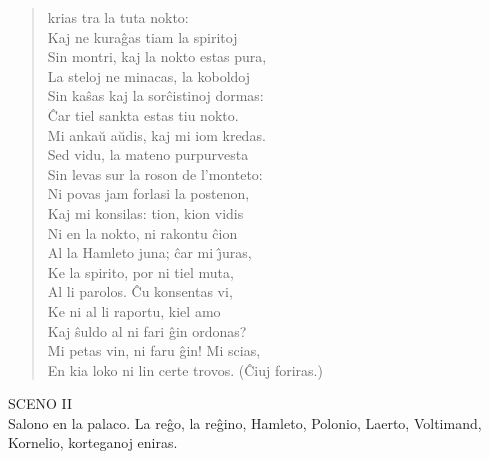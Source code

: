 \begin{verse}
krias tra la tuta nokto:\\ Kaj ne kura\^gas tiam la spiritoj\\ Sin
montri, kaj la nokto estas pura,\\ La steloj ne minacas, la
koboldoj\\ Sin ka\^sas kaj la sor\^cistinoj dormas:\\ \^Car tiel
sankta estas tiu nokto.\\
 Mi anka\u u a\u udis, kaj mi iom kredas.\\ Sed vidu,
la mateno purpurvesta\\ Sin levas sur la roson de l'monteto:\\ Ni
povas jam forlasi la postenon,\\ Kaj mi konsilas: tion, kion vidis\\
Ni en la nokto, ni rakontu \^cion\\ Al la Hamleto juna; \^car mi
\^{\j}uras,\\ Ke la spirito, por ni tiel muta,\\ Al li parolos. \^Cu
konsentas vi,\\ Ke ni al li raportu, kiel amo\\ Kaj \^suldo al ni
fari \^gin ordonas?\\
 Mi petas vin, ni faru \^gin! Mi scias,\\ En kia
loko ni lin certe trovos. {\footnotesize (Ĉiuj foriras.)}
\end{verse}

\begin{center}
{\large SCENO II}\\[1ex]

\footnotesize Salono en la palaco. La reĝo, la reĝino, Hamleto, Polonio,
Laerto, Voltimand, Kornelio, korteganoj eniras.
\end{center}

